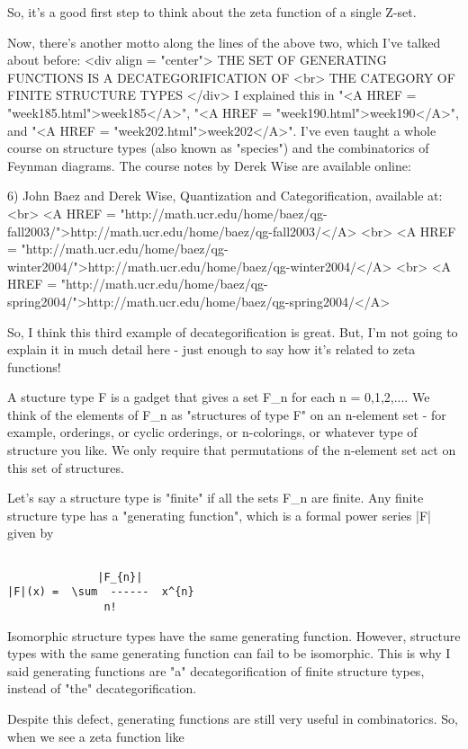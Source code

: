 So, it's a good first step to think about the zeta function of a single 
Z-set.

Now, there's another motto along the lines of the above two, which I've
talked about before:
<div align = "center">
   THE SET OF GENERATING FUNCTIONS IS A DECATEGORIFICATION OF <br>
                 THE CATEGORY OF FINITE STRUCTURE TYPES
</div>
I explained this in "<A HREF = "week185.html">week185</A>", "<A HREF = "week190.html">week190</A>", and "<A HREF = "week202.html">week202</A>".  I've even taught a
whole course on structure types (also known as "species") and the 
combinatorics of Feynman diagrams.  The course notes by Derek Wise are 
available online:

6) John Baez and Derek Wise, Quantization and Categorification, available at:<br>
<A HREF = "http://math.ucr.edu/home/baez/qg-fall2003/">http://math.ucr.edu/home/baez/qg-fall2003/</A> <br>
<A HREF = "http://math.ucr.edu/home/baez/qg-winter2004/">http://math.ucr.edu/home/baez/qg-winter2004/</A> <br>
<A HREF = "http://math.ucr.edu/home/baez/qg-spring2004/">http://math.ucr.edu/home/baez/qg-spring2004/</A> 

So, I think this third example of decategorification is great.  But, I'm not 
going to explain it in much detail here - just enough to say how it's related
to zeta functions!

A stucture type F is a gadget that gives a set F_{n}
for each n = 0,1,2,....
We think of the elements of F_{n} 
as "structures of type F" on an n-element 
set - for example, orderings, or cyclic orderings, or n-colorings, or 
whatever type of structure you like.  We only require that permutations of 
the n-element set act on this set of structures.  

Let's say a structure type is "finite" if all the
sets F_{n} are finite.
Any finite structure type has a "generating function", 
which is a formal power series |F| given by


\begin{verbatim}

              |F_{n}|
|F|(x) =  \sum  ------  x^{n}
               n! 
\end{verbatim}
    

Isomorphic structure types have the same generating function.
However, structure types with the same generating function can fail to
be isomorphic.  This is why I said generating functions are
"a" decategorification of finite structure types, instead of
"the" decategorification.

Despite this defect, generating functions are still very useful in 
combinatorics.  So, when we see a zeta function like

